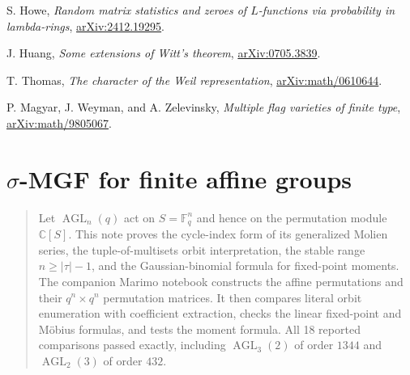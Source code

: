 \documentclass[10pt]{article}
\newcommand{\Sym}{\operatorname{Sym}}
\newcommand{\Fix}{\operatorname{Fix}}
\newcommand{\F}{\mathbb F}
\newcommand{\GL}{\operatorname{GL}}
\newcommand{\im}{\operatorname{im}}
\begin{document}
\begin{thebibliography}{9}
S. Howe, \emph{Random matrix statistics and zeroes of $L$-functions via
probability in lambda-rings}, \href{https://arxiv.org/abs/2412.19295}{arXiv:2412.19295}.

J. Huang, \emph{Some extensions of Witt's theorem},
\href{https://arxiv.org/abs/0705.3839}{arXiv:0705.3839}.

T. Thomas, \emph{The character of the Weil representation},
\href{https://arxiv.org/abs/math/0610644}{arXiv:math/0610644}.

P. Magyar, J. Weyman, and A. Zelevinsky, \emph{Multiple flag varieties of
finite type}, \href{https://arxiv.org/abs/math/9805067}{arXiv:math/9805067}.
\end{thebibliography}
\endgroup


\clearpage
\section{$\sigma$-MGF for finite affine groups}\label{proof:affine}
\begingroup
{}
\providecommand{\F}{\mathbb F}
\renewcommand{\F}{\mathbb F}
\providecommand{\AGL}{\operatorname{AGL}}
\renewcommand{\AGL}{\operatorname{AGL}}
\providecommand{\GL}{\operatorname{GL}}
\renewcommand{\GL}{\operatorname{GL}}
\providecommand{\Mult}{\operatorname{Mult}}
\renewcommand{\Mult}{\operatorname{Mult}}
\providecommand{\Sym}{\operatorname{Sym}}
\renewcommand{\Sym}{\operatorname{Sym}}
\providecommand{\Fix}{\operatorname{Fix}}
\renewcommand{\Fix}{\operatorname{Fix}}
\providecommand{\im}{\operatorname{im}}
\renewcommand{\im}{\operatorname{im}}
\providecommand{\cA}{\mathcal A}
\renewcommand{\cA}{\mathcal A}
\setcounter{theorem}{0}
\setcounter{proposition}{0}
\setcounter{lemma}{0}
\setcounter{corollary}{0}
\setcounter{remark}{0}
\begin{abstract}
Let $\AGL_n(q)$ act on $S=\F_q^n$ and hence on the permutation module
$\mathbb C[S]$.  This note proves the cycle-index form of its generalized
Molien series, the tuple-of-multisets orbit interpretation, the stable range
$n\ge |\tau|-1$, and the Gaussian-binomial formula for fixed-point moments.
The companion Marimo notebook constructs the affine permutations and their
$q^n\times q^n$ permutation matrices.  It then compares literal orbit
enumeration with coefficient extraction, checks the linear fixed-point and
Möbius formulas, and tests the moment formula.  All 18 reported comparisons
passed exactly, including $\AGL_3(2)$ of order $1344$ and $\AGL_2(3)$ of
order $432$.
\end{abstract}
\end{document}
